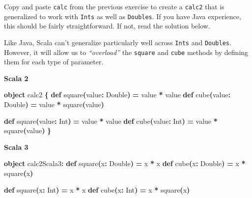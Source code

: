 \documentclass[11pt,a5paper,]{book}
\newenvironment{Shaded}{\begin{snugshade}}{\end{snugshade}}
\newcommand{\BuiltInTok}[1]{#1}
\newcommand{\ExtensionTok}[1]{#1}
\newcommand{\FunctionTok}[1]{\textcolor[rgb]{0.00,0.00,0.00}{#1}}
\newcommand{\KeywordTok}[1]{\textcolor[rgb]{0.13,0.29,0.53}{\textbf{#1}}}
\newcommand{\NormalTok}[1]{#1}
\newcommand{\OperatorTok}[1]{\textcolor[rgb]{0.81,0.36,0.00}{\textbf{#1}}}
\begin{document}
Copy and paste \texttt{calc} from the previous exercise to create a
\texttt{calc2} that is generalized to work with \texttt{Ints} as well as
\texttt{Doubles}. If you have Java experience, this should be fairly
straightforward. If not, read the solution below.

Like Java, Scala can't generalize particularly well across \texttt{Ints}
and \texttt{Doubles}. However, it will allow us to \emph{``overload''}
the \texttt{square} and \texttt{cube} methods by defining them for each
type of parameter.

\textbf{Scala 2}

\begin{Shaded}
\begin{Highlighting}[]
\KeywordTok{object}\NormalTok{ calc2 }\OperatorTok{\{}
  \KeywordTok{def} \FunctionTok{square}\OperatorTok{(}\NormalTok{value}\OperatorTok{:} \ExtensionTok{Double}\OperatorTok{)} \OperatorTok{=}\NormalTok{ value }\OperatorTok{*}\NormalTok{ value}
  \KeywordTok{def} \FunctionTok{cube}\OperatorTok{(}\NormalTok{value}\OperatorTok{:} \ExtensionTok{Double}\OperatorTok{)} \OperatorTok{=}\NormalTok{ value }\OperatorTok{*} \FunctionTok{square}\OperatorTok{(}\NormalTok{value}\OperatorTok{)}

  \KeywordTok{def} \FunctionTok{square}\OperatorTok{(}\NormalTok{value}\OperatorTok{:} \BuiltInTok{Int}\OperatorTok{)} \OperatorTok{=}\NormalTok{ value }\OperatorTok{*}\NormalTok{ value}
  \KeywordTok{def} \FunctionTok{cube}\OperatorTok{(}\NormalTok{value}\OperatorTok{:} \BuiltInTok{Int}\OperatorTok{)} \OperatorTok{=}\NormalTok{ value }\OperatorTok{*} \FunctionTok{square}\OperatorTok{(}\NormalTok{value}\OperatorTok{)}
\OperatorTok{\}}
\end{Highlighting}
\end{Shaded}

\textbf{Scala 3}

\begin{Shaded}
\begin{Highlighting}[]
\KeywordTok{object}\NormalTok{ calc2Scala3}\OperatorTok{:}
  \KeywordTok{def} \FunctionTok{square}\OperatorTok{(}\NormalTok{x}\OperatorTok{:} \ExtensionTok{Double}\OperatorTok{)} \OperatorTok{=}\NormalTok{ x }\OperatorTok{*}\NormalTok{ x}
  \KeywordTok{def} \FunctionTok{cube}\OperatorTok{(}\NormalTok{x}\OperatorTok{:} \ExtensionTok{Double}\OperatorTok{)} \OperatorTok{=}\NormalTok{ x }\OperatorTok{*} \FunctionTok{square}\OperatorTok{(}\NormalTok{x}\OperatorTok{)}

  \KeywordTok{def} \FunctionTok{square}\OperatorTok{(}\NormalTok{x}\OperatorTok{:} \BuiltInTok{Int}\OperatorTok{)} \OperatorTok{=}\NormalTok{ x }\OperatorTok{*}\NormalTok{ x}
  \KeywordTok{def} \FunctionTok{cube}\OperatorTok{(}\NormalTok{x}\OperatorTok{:} \BuiltInTok{Int}\OperatorTok{)} \OperatorTok{=}\NormalTok{ x }\OperatorTok{*} \FunctionTok{square}\OperatorTok{(}\NormalTok{x}\OperatorTok{)}
\end{Highlighting}
\end{Shaded}
\end{document}
